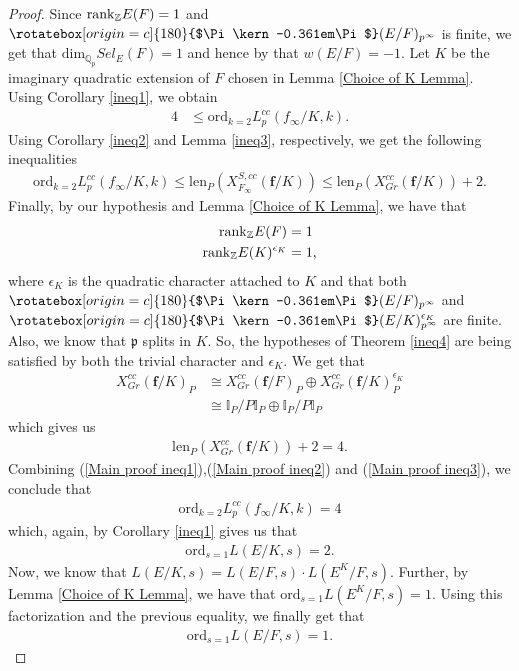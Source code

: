 \documentclass[reqno,10pt]{amsart}
\newcommand{\qp}{\mathbb{Q}_{p}}
\newcommand{\z}{\mathbb{Z}}
\newcommand{\I}{\mathbb{I}}
\newcommand{\f}{\mathbf{f}}
\newcommand{\p}{\mathfrak{p}}
\newcommand{\Varpi}{\rotatebox[origin=c]{180}{$\Pi\kern-0.361em\Pi$}}
\theoremstyle{plain}
\theoremstyle{definition}
\begin{document}
\begin{proof}
   Since $\mathrm{rank}_\z \hspace{0.01mm} E(F) = 1$ and $\Varpi(E/F)_{p^\infty}$ is finite, we get that $\mathrm{dim}_{\qp} Sel_E(F) = 1$ and hence by \cite[Theorem E]{NekParity} that $w(E/F) = -1$. Let $K$ be the imaginary quadratic extension of $F$ chosen in Lemma \ref{Choice of K Lemma}. Using Corollary \ref{ineq1}, we obtain
   \begin{align} \label{Main proof ineq1}
       4 & \leq \mathrm{ord}_{k=2} L_p^{cc}(f_\infty/K,k).
   \end{align}
   Using Corollary \ref{ineq2} and Lemma \ref{ineq3}, respectively, we get the following inequalities
   \begin{align} \label{Main proof ineq2}
       \mathrm{ord}_{k=2} L_p^{cc}(f_\infty/K,k) \leq \mathrm{len}_P(X^{S,cc}_{F_\infty}(\f/K)) \leq \mathrm{len}_P(X^{cc}_{Gr}(\f/K)) + 2.
   \end{align}
   Finally, by our hypothesis and Lemma \ref{Choice of K Lemma}, we have that
\begin{align*}
    \mathrm{rank}_\z \hspace{0.01mm} E(F) & = 1 \\
    \mathrm{rank}_\z \hspace{0.01mm} E(K)^{\epsilon_K} & = 1,
\end{align*}
where $\epsilon_K$ is the quadratic character attached to $K$ and that both $\Varpi(E/F)_{p^\infty}$ and $\Varpi(E/K)_{p^\infty}^{\epsilon_K}$ are finite. Also, we know that $\p$ splits in $K$. So, the hypotheses of Theorem \ref{ineq4} are being satisfied by both the trivial character and $\epsilon_K$. We get that 
\begin{align*}
    X^{cc}_{Gr}(\f/K)_P & \cong X^{cc}_{Gr}(\f/F)_P \oplus X^{cc}_{Gr}(\f/K)_P^{\epsilon_K} \\
    & \cong \I_P/P\I_P \oplus \I_P/P\I_P
\end{align*}
which gives us
\begin{align} \label{Main proof ineq3}
    \mathrm{len}_P(X^{cc}_{Gr}(\f/K)) + 2 = 4.
\end{align}
Combining (\ref{Main proof ineq1}),(\ref{Main proof ineq2}) and (\ref{Main proof ineq3}), we conclude that 
\begin{align*}
    \mathrm{ord}_{k=2} L_p^{cc}(f_\infty/K,k) = 4
\end{align*}
which, again, by Corollary \ref{ineq1} gives us that 
\begin{align*}
    \mathrm{ord}_{s=1} L(E/K,s) = 2.
\end{align*}
Now, we know that $L(E/K,s) = L(E/F,s) \cdot L(E^K/F,s)$. Further, by Lemma \ref{Choice of K Lemma}, we have that $\mathrm{ord}_{s=1} L(E^K/F,s) = 1$. Using this factorization and the previous equality, we finally get that
\begin{align*}
    \mathrm{ord}_{s=1} L(E/F,s) = 1.
\end{align*}
\end{proof}
\end{document}
